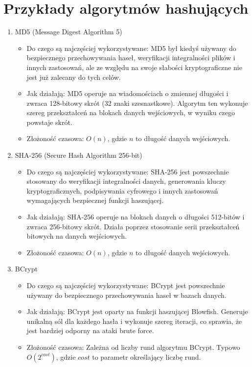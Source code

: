 \documentclass{article}
\begin{document}
\newpage
\section{Przykłady algorytmów hashujących}

\begin{enumerate}
    \item MD5 (Message Digest Algorithm 5)
    \begin{itemize}
        \item[]Do czego są najczęściej wykorzystywane: MD5 był kiedyś używany do bezpiecznego przechowywania haseł, weryfikacji integralności plików i innych zastosowań, ale ze względu na swoje słabości kryptograficzne nie jest już zalecany do tych celów.
        \\
        \item[] Jak działają: MD5 operuje na wiadomościach o zmiennej długości i zwraca 128-bitowy skrót (32 znaki szesnastkowe). Algorytm ten wykonuje szereg przekształceń na blokach danych wejściowych, w wyniku czego powstaje skrót. 
        \\
        \item[] Złożoność czasowa: $O(n)$, gdzie $n$ to długość danych wejściowych.
    \end{itemize}
    
    \item SHA-256 (Secure Hash Algorithm 256-bit)
    \begin{itemize}
        \item[] Do czego są najczęściej wykorzystywane: SHA-256 jest powszechnie stosowany do weryfikacji integralności danych, generowania kluczy kryptograficznych, podpisywania cyfrowego i innych zastosowań wymagających bezpiecznej funkcji haszującej.
        \\
        \item[] Jak działają: SHA-256 operuje na blokach danych o długości 512-bitów i zwraca 256-bitowy skrót. Działa poprzez stosowanie serii przekształceń bitowych na danych wejściowych.
        \\
        \item[] Złożoność czasowa: $O(n)$, gdzie $n$ to długość danych wejściowych.
    \end{itemize}
    
    \item BCrypt
    \begin{itemize}
        \item[]Do czego są najczęściej wykorzystywane: BCrypt jest powszechnie używany do bezpiecznego przechowywania haseł w bazach danych.
        \\
        \item[] Jak działają: BCrypt jest oparty na funkcji haszującej Blowfish. Generuje unikalną sól dla każdego hasła i wykonuje szereg iteracji, co sprawia, że jest bardziej odporny na ataki brute force. 
        \\
        \item[] Złożoność czasowa: Zależna od liczby rund algorytmu BCrypt.
        Typowo $O(2^{cost})$, gdzie $cost$ to parametr określający liczbę rund.
    \end{itemize}
    

\end{enumerate}
\end{document}
